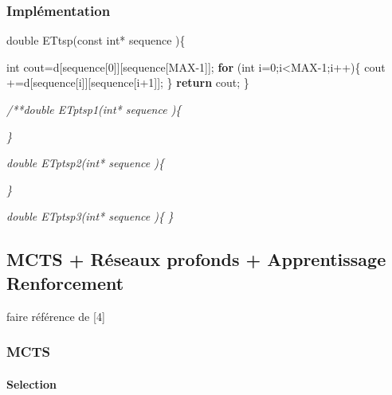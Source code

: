 \documentclass[]{article}
\newenvironment{Shaded}{}{}
\newcommand{\AttributeTok}[1]{\textcolor[rgb]{0.49,0.56,0.16}{#1}}
\newcommand{\CommentTok}[1]{\textcolor[rgb]{0.38,0.63,0.69}{\textit{#1}}}
\newcommand{\ControlFlowTok}[1]{\textcolor[rgb]{0.00,0.44,0.13}{\textbf{#1}}}
\newcommand{\DataTypeTok}[1]{\textcolor[rgb]{0.56,0.13,0.00}{#1}}
\newcommand{\DecValTok}[1]{\textcolor[rgb]{0.25,0.63,0.44}{#1}}
\newcommand{\NormalTok}[1]{#1}
\let\oldparagraph\paragraph
\renewcommand{\paragraph}[1]{\oldparagraph{#1}\mbox{}}
\begin{document}
\hypertarget{impluxe9mentation-2}{%
\subsubsection{Implémentation}\label{impluxe9mentation-2}}

\begin{Shaded}
\begin{Highlighting}[]

    \DataTypeTok{double}\NormalTok{ ETtsp(}\AttributeTok{const} \DataTypeTok{int}\NormalTok{* sequence )\{}

        \DataTypeTok{int}\NormalTok{ cout=d[sequence[}\DecValTok{0}\NormalTok{]][sequence[MAX-}\DecValTok{1}\NormalTok{]];}
        \ControlFlowTok{for}\NormalTok{ (}\DataTypeTok{int}\NormalTok{ i=}\DecValTok{0}\NormalTok{;i<MAX-}\DecValTok{1}\NormalTok{;i++)\{}
\NormalTok{            cout +=d[sequence[i]][sequence[i+}\DecValTok{1}\NormalTok{]];}
\NormalTok{        \}}
        \ControlFlowTok{return}\NormalTok{ cout;}
\NormalTok{    \}}


    \CommentTok{/**double ETptsp1(int* sequence )\{}


\CommentTok{    \}}


\CommentTok{    double ETptsp2(int* sequence )\{}

\CommentTok{    \}}


\CommentTok{    double ETptsp3(int* sequence )\{}
\CommentTok{        }
\CommentTok{    \}}
\end{Highlighting}
\end{Shaded}

\hypertarget{mcts--ruxe9seaux-profonds--apprentissage-renforcement}{%
\subsection{MCTS + Réseaux profonds + Apprentissage
Renforcement}\label{mcts--ruxe9seaux-profonds--apprentissage-renforcement}}

faire référence de {[}4{]}

\hypertarget{mcts}{%
\subsubsection{MCTS}\label{mcts}}

\hypertarget{selection}{%
\paragraph{Selection}\label{selection}}
\end{document}
